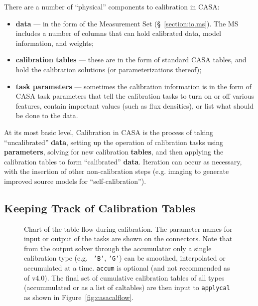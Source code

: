 There are a number of ``physical'' components to calibration in CASA:
\begin{itemize}
   \item {\bf data} --- in the form of the Measurement Set
      (\S~\ref{section:io.ms}).  The MS includes a number of
      columns that can hold calibrated data, model information,
      and weights;
   \item {\bf calibration tables} --- these are in the form of
      standard CASA tables, and hold the calibration solutions
      (or parameterizations thereof);
   \item {\bf task parameters} --- sometimes the calibration
      information is in the form of CASA task parameters that
      tell the calibration tasks to turn on or off various
      features, contain important values (such as flux densities),
      or list what should be done to the data.
\end{itemize}

At its most basic level, Calibration in CASA is the process of taking
``uncalibrated'' {\bf data}, setting up the operation of calibration
tasks using {\bf parameters}, solving for new calibration {\bf
tables}, and then applying the calibration tables to form 
``calibrated'' {\bf data}.  Iteration can occur as necessary, with
the insertion of other non-calibration steps
(e.g. imaging to generate improved source models for
``self-calibration'').

\subsection{Keeping Track of Calibration Tables}
\label{section:cal.flow.tables}

\begin{figure}[h!]
\begin{center}
\caption{\label{fig:casacaltables} Chart of the table flow during
  calibration. The parameter names for input or output of the tasks
  are shown on the connectors.  Note that from the output solver
  through the accumulator only a single calibration type (e.g. {\tt
    'B'}, {\tt 'G'}) can be smoothed, interpolated or accumulated at a
  time.  {\tt accum} is optional (and not recommended as of v4.0). The final
  set of cumulative calibration tables of all types (accummulated or
  as a list of caltables) are then input to {\tt applycal} as shown in
  Figure~\ref{fig:casacalflow}. }
\hrulefill
\end{center}
\end{figure}

